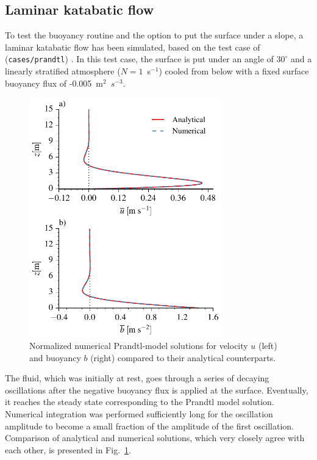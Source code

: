 \documentclass[gmd]{copernicus}
\begin{document}
\subsection{Laminar katabatic flow} \label{sec:laminarkatabatic}
To test the buoyancy routine and the option to put the surface under a slope, a laminar katabatic flow has been simulated, based on the test case of \citet{Prandtl1942} (\texttt{cases/prandtl}) . In this test case, the surface is put under an angle of $30^{\circ}$ and a linearly stratified atmosphere ($N = 1$~s$^{-1}$)  cooled from below with a fixed surface buoyancy flux of -0.005~m$^2$~$s^{-3}$.

\begin{figure}[t]
	\vspace*{2mm}
	\begin{center}
		\includegraphics[width=8.3cm]{figs/prandtlslope.pdf}
	\end{center}
	\caption{Normalized numerical Prandtl-model solutions for velocity $u$ (left) and buoyancy $b$ (right) compared to their analytical counterparts.}
	\label{fig:prandtl}
\end{figure}

The fluid, which was initially at rest, goes through a series of decaying oscillations after the negative buoyancy flux is applied at the surface. Eventually, it reaches the steady state corresponding to the Prandtl model solution. Numerical integration was performed sufficiently long for the oscillation amplitude to become a small fraction of the amplitude of the first oscillation. Comparison of analytical and numerical solutions, which very closely agree with each other, is presented in Fig.~\ref{fig:prandtl}.
\end{document}
